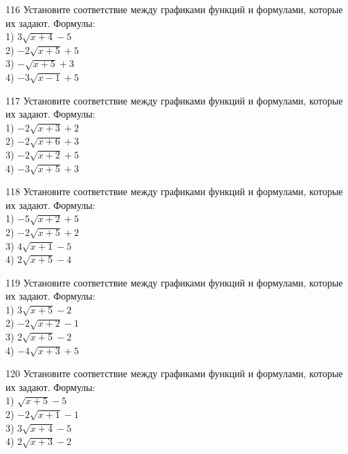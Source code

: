 \documentclass[4apaper]{article}
\begin{document}
\begin{taskBN}{116}
Установите соответствие между графиками функций и формулами, которые их задают. Формулы: \\1) $3\sqrt{x+4}-5$\\2) $-2\sqrt{x+5}+5$\\3) $-\sqrt{x+5}+3$\\4) $-3\sqrt{x-1}+5$
\end{taskBN}

\begin{taskBN}{117}
Установите соответствие между графиками функций и формулами, которые их задают. Формулы: \\1) $-2\sqrt{x+3}+2$\\2) $-2\sqrt{x+6}+3$\\3) $-2\sqrt{x+2}+5$\\4) $-3\sqrt{x+5}+3$
\end{taskBN}

\begin{taskBN}{118}
Установите соответствие между графиками функций и формулами, которые их задают. Формулы: \\1) $-5\sqrt{x+2}+5$\\2) $-2\sqrt{x+5}+2$\\3) $4\sqrt{x+1}-5$\\4) $2\sqrt{x+5}-4$
\end{taskBN}

\begin{taskBN}{119}
Установите соответствие между графиками функций и формулами, которые их задают. Формулы: \\1) $3\sqrt{x+5}-2$\\2) $-2\sqrt{x+2}-1$\\3) $2\sqrt{x+5}-2$\\4) $-4\sqrt{x+3}+5$
\end{taskBN}

\begin{taskBN}{120}
Установите соответствие между графиками функций и формулами, которые их задают. Формулы: \\1) $\sqrt{x+5}-5$\\2) $-2\sqrt{x+1}-1$\\3) $3\sqrt{x+4}-5$\\4) $2\sqrt{x+3}-2$
\end{taskBN}
\end{document}
